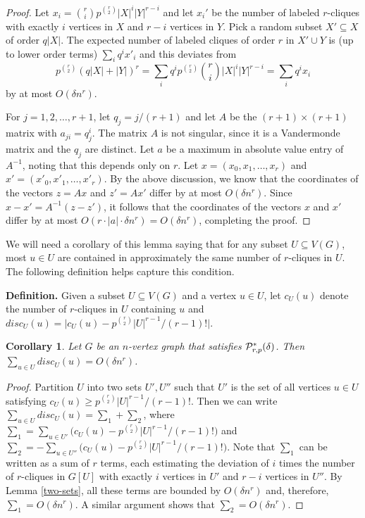 \documentclass[11pt]{article}
\newtheorem{corollary}{Corollary}[section]
\begin{document}
\begin{proof}
Let $x_i={r \choose i} p^{{r \choose 2}}|X|^i|Y|^{r-i}$ and let $x_i'$ be the number of labeled $r$-cliques with exactly $i$ vertices in $X$ and $r-i$ vertices in $Y$. Pick a random subset $X' \subseteq X$ of order $q|X|$. The expected number of labeled cliques of order $r$ in $X' \cup Y$ is (up to lower order terms)
$\sum_i q^i x'_i$ and this deviates from 
$$p^{{r \choose 2}} (q|X|+|Y|)^r= \sum_i q^ip^{{r \choose 2}}{r \choose i} |X|^i|Y|^{r-i}  = \sum_i q^i x_i$$ 
by at most $O(\delta n^r)$.

For $j = 1, 2, \dots, r+1$, let $q_j=j/(r+1)$ and let $A$ be the $(r+1) \times (r+1)$ matrix with
$a_{ji}=q_j^i$. The matrix $A$ is not singular, since it is a Vandermonde matrix and the $q_j$ are distinct.
Let $a$ be a maximum in absolute value entry of $A^{-1}$, noting that this depends only on $r$.
Let $x=(x_0, x_1, \ldots, x_r)$ and $x'=(x'_0, x'_1, \ldots, x'_r)$.
By the above discussion, we know that the coordinates of the vectors $z=Ax$ and $z'=Ax'$ differ by at most
$O(\delta n^r)$. Since $x-x'=A^{-1}(z-z')$, it follows that the coordinates of the vectors 
$x$ and $x'$ differ by at most $O(r \cdot |a| \cdot \delta n^r)=O(\delta n^r)$, completing the proof.
\end{proof}

We will need a corollary of this lemma saying that for any subset $U \subseteq V(G)$, most $u \in U$ are contained in approximately the same number of $r$-cliques in $U$. The following definition helps capture this condition.

\vspace{3mm}

\noindent
{\bf Definition.} Given a subset $U\subseteq V(G)$ and a vertex $u \in U$, let $c_{U}(u)$ denote the number of $r$-cliques in $U$ containing $u$ and $disc_{U}(u)=\big|c_U(u) - p^{{r \choose 2}} |U|^{r-1}/(r-1)!\big|$.

\begin{corollary}
\label{vertex-discrepancy}
Let $G$ be an $n$-vertex graph that satisfies
${\cal P}^*_{r,p}(\delta)$. Then $\sum_{u \in U} disc_{U}(u) = O(\delta n^r)$. 
\end{corollary}

\begin{proof}
Partition $U$ into two sets $U', U''$ such that $U'$ is the set of all vertices $u \in U$ satisfying
$c_U(u) \geq p^{{r \choose 2}} |U|^{r-1}/(r-1)!$. Then we can write 
$\sum_{u \in U} disc_{U}(u)= \sum_1+\sum_2$, where $\sum_1=\sum_{u \in U'} \big(c_U(u) - p^{{r \choose 2}} |U|^{r-1}/(r-1)!\big)$ and
$\sum_2=-\sum_{u \in U''} \big(c_U(u) - p^{{r \choose 2}} |U|^{r-1}/(r-1)!\big)$. Note that $\sum_1$ can be written as a sum of $r$ terms, each estimating the deviation of $i$ times the number of $r$-cliques in $G[U]$ with exactly $i$ vertices in $U'$ and $r-i$ vertices in $U''$. By Lemma \ref{two-sets}, all these terms are bounded by $O(\delta n^r)$ and, therefore, $\sum_1=O(\delta n^r)$. A similar argument shows that $\sum_2=O(\delta n^r)$.
\end{proof}
\end{document}
